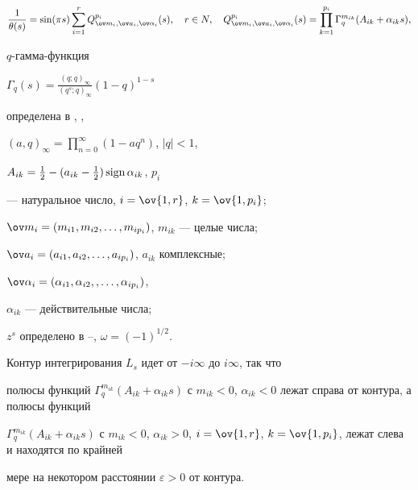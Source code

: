 $$


\frac{1}{\theta(s)}=\sin(\pi s)\sum^r_{i=1} 


Q^{p_i}_{\ov m_i,\ov a_i,\ov\alpha_i}(s),\quad r\in N,\quad


% 


Q^{p_i}_{\ov m_i,\ov a_i,\ov\alpha_i}(s)= 


\prod^{p_i}_{k=1}\Gamma^{m_{i k}}_q(A_{i k}+\alpha_{i k}s), 


$$


$q$-гамма-функция 


$\Gamma_q(s)=\frac{(q;q)_\infty}{(q^s;q)_\infty}(1-q)^{1-s}$ 


определена в \cite{1}, \cite{2}, 


$(a,q)_\infty=\prod\limits^\infty_{n=0} 


(1-a q^n)$, $|q|<1$, 


$A_{i k}=\frac{1}{2}-(a_{i k}-\frac{1}{2})\operatorname{sign} \alpha_{i k}$, $p_i$ 


--- натуральное число, $i=\ov{1,r}$, $k=\ov{1,p_i}$; 


$\ov m_i=(m_{i1},m_{i2},\dotsc,m_{i p_i})$, $m_{i k}$ --- целые числа; 


$\ov a_i=(a_{i1},a_{i2},\dotsc,a_{i p_i})$, $a_{i k}$ комплексные; 


$\ov\alpha_i=(\alpha_{i1},\alpha_{i2},,\dotsc,\alpha_{i p_i})$, 


$\alpha_{i k}$ --- действительные числа; 


$z^s$ определено в \cite{15}--\cite{17}, $\omega=(-1)^{1/2}$. 


Контур интегрирования $L_s$ идет от $-i\infty$ до $i\infty$, так что 


полюсы функций $\Gamma^{m_{i k}}_q(A_{i k}+\alpha_{i k}s)$ с $m_{i 


k}<0$, $\alpha_{i k}<0$ лежат справа от контура, а полюсы функций 


$\Gamma^{m_{ i k}}_q(A_{i k}+\alpha_{i k}s)$ с $m_{i k}<0$, $\alpha_{i 


k}>0$, $i=\ov{1,r}$, $k=\ov{1,p_i}$, лежат слева и находятся по крайней 


мере на некотором расстоянии $\varepsilon>0$ от контура. 


 


